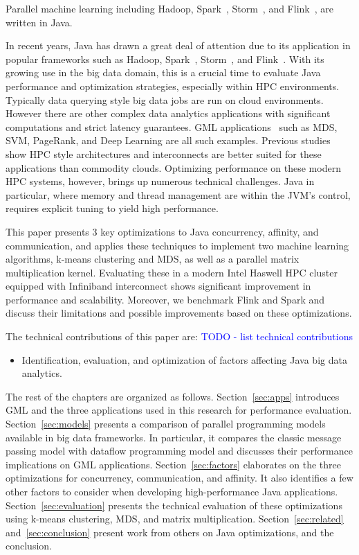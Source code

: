 \documentclass[10pt, conference, compsocconf]{IEEEtran}
\begin{document}
Parallel machine learning 
 including Hadoop, Spark~\cite{Zaharia:2010:SCC:1863103.1863113}, Storm~\cite{toshniwal2014storm}, and Flink~\cite{carbone2015lightweight}, are written in Java.


In recent years, Java has drawn a great deal of attention due to its application in popular frameworks such as Hadoop, Spark~\cite{Zaharia:2010:SCC:1863103.1863113}, Storm~\cite{toshniwal2014storm}, and Flink~\cite{carbone2015lightweight}. With its growing use in the big data domain, this is a crucial time to evaluate Java performance and optimization strategies, especially within \ac{HPC} environments. Typically data querying style big data jobs are run on cloud environments. However there are other complex data analytics applications with significant computations and strict latency guarantees. \ac{GML} applications~ such as \ac{MDS}, \ac{SVM}, PageRank, and Deep Learning are all such examples. Previous studies~ show \ac{HPC} style architectures and interconnects are better suited for these applications than commodity clouds. Optimizing performance on these modern \ac{HPC} systems, however, brings up numerous technical challenges. Java in particular, where memory and thread management are within the \ac{JVM}'s control, requires explicit tuning to yield high performance. 

This paper presents 3 key optimizations to Java concurrency, affinity, and communication, and applies these techniques to implement two machine learning algorithms, k-means clustering and \ac{MDS}, as well as a parallel matrix multiplication kernel. Evaluating these in a modern Intel Haswell \ac{HPC} cluster equipped with Infiniband interconnect shows significant improvement in performance and scalability. Moreover, we benchmark Flink and Spark and discuss their limitations and possible improvements based on these optimizations. 

The technical contributions of this paper are:
\textcolor{blue}{TODO - list technical contributions}
\begin{itemize}
\item Identification, evaluation, and optimization of factors affecting Java big data analytics. 
\end{itemize}

The rest of the chapters are organized as follows. Section~\ref{sec:apps} introduces \ac{GML} and the three applications used in this research for performance evaluation. Section~\ref{sec:models} presents a comparison of parallel programming models available in big data frameworks. In particular, it compares the classic  message passing model with dataflow programming model and discusses their performance implications on \ac{GML} applications. Section~\ref{sec:factors} elaborates on the three optimizations for concurrency, communication, and affinity. It also identifies a few other factors to consider when developing high-performance Java applications. Section~\ref{sec:evaluation} presents the technical evaluation of these optimizations using k-means clustering, \ac{MDS}, and matrix multiplication. Section~\ref{sec:related} and~\ref{sec:conclusion} present work from others on Java optimizations, and the conclusion.
\end{document}
